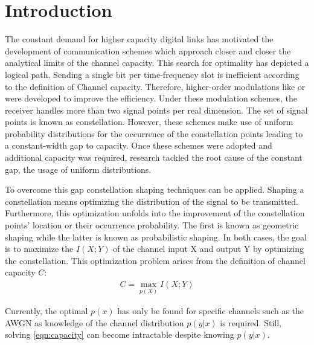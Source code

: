 \chapter{Introduction}\label{chap:introduction}

The constant demand for higher capacity digital links has motivated the development of communication schemes which approach closer and closer the analytical limits of the channel capacity. This search for optimality has depicted a logical path. Sending a single bit per time-frequency slot is inefficient according to the definition of Channel capacity. Therefore, higher-order modulations like  or  were developed to improve the efficiency. Under these modulation schemes, the receiver handles more than two signal points per real dimension. The set of signal points is known as constellation. However, these schemes make use of uniform probability distributions for the occurrence of the constellation points leading to a constant-width gap to capacity. Once these schemes were adopted and additional capacity was required, research tackled the root cause of the constant gap, the usage of uniform distributions.

To overcome this gap constellation shaping techniques can be applied. Shaping a constellation means optimizing the distribution of the signal to be transmitted. Furthermore, this optimization unfolds into the improvement of the constellation points' location or their occurrence probability. The first is known as geometric shaping while the latter is known as probabilistic shaping. In both cases, the goal is to maximize the  $I(X;Y)$ of the channel  input X and output Y by optimizing the constellation. This optimization problem arises from the definition of channel capacity $C$:
\begin{align}
\label{eqn:capacity}
	C = \max_{p(X)} I(X;Y)
\end{align}

Currently, the optimal $p(x)$ has only be found for specific channels such as the AWGN as knowledge of the channel distribution $p(y|x)$ is required. Still, solving \ref{eqn:capacity} can become intractable despite knowing $p(y|x)$.

